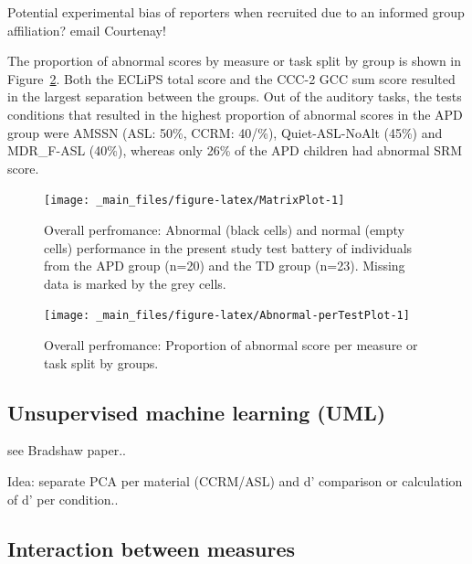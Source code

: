 \documentclass[a4paper, twoside]{templates/ociamthesis}
\begin{document}
\begin{correction}
{Potential experimental bias of reporters when recruited due to an
informed group affiliation? email Courtenay!}
\end{correction}

\hfill\break
The proportion of abnormal scores by measure or task split by group is shown in Figure~\ref{fig:Abnormal-perTestPlot}. Both the ECLiPS total score and the CCC-2 GCC sum score resulted in the largest separation between the groups. Out of the auditory tasks, the tests conditions that resulted in the highest proportion of abnormal scores in the APD group were AMSSN (ASL: 50\%, CCRM: 40/\%), Quiet-ASL-NoAlt (45\%) and MDR\_F-ASL (40\%), whereas only 26\% of the APD children had abnormal SRM score.\\

\begin{figure}

{\centering \texttt{[image: \_main\_files/figure-latex/MatrixPlot-1]} 

}

\caption{Overall perfromance: Abnormal (black cells) and normal (empty cells) performance in the present study test battery of individuals from the APD group (n=20) and the TD group (n=23). Missing data is marked by the grey cells.}\label{fig:MatrixPlot}
\end{figure}

\begin{figure}

{\centering \texttt{[image: \_main\_files/figure-latex/Abnormal-perTestPlot-1]} 

}

\caption{Overall perfromance: Proportion of abnormal score per measure or task split by groups.}\label{fig:Abnormal-perTestPlot}
\end{figure}

\hypertarget{unsupervised-machine-learning-uml}{%
\subsection{Unsupervised machine learning (UML)}\label{unsupervised-machine-learning-uml}}

see Bradshaw paper..

Idea: separate PCA per material (CCRM/ASL) and d' comparison or calculation of d' per condition..

\hypertarget{interaction-between-measures}{%
\subsection{Interaction between measures}\label{interaction-between-measures}}
\end{document}
